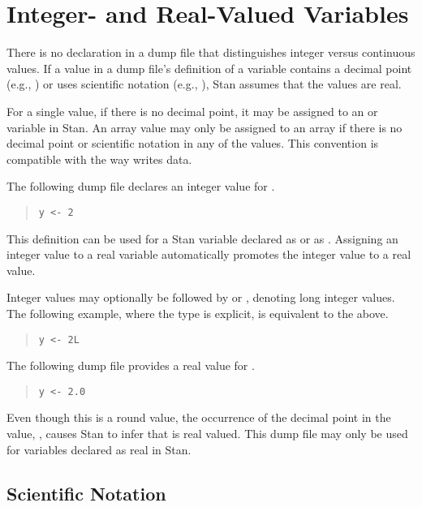 \section{Integer- and Real-Valued Variables}

There is no declaration in a dump file that distinguishes integer
versus continuous values.  If a value in a dump file's definition of a
variable contains a decimal point (e.g., ) or uses
scientific notation (e.g., ), Stan assumes that the
values are real.

For a single value, if there is no decimal point, it may be assigned
to an  or  variable in Stan.  An array value may
only be assigned to an  array if there is no decimal point
or scientific notation in any of the values.  This convention is
compatible with the way \R writes data.

The following dump file declares an integer value for .
%
\begin{quote}
\begin{Verbatim} 
y <- 2
\end{Verbatim}
\end{quote}
% 
This definition can be used for a Stan variable  declared as
 or as .  Assigning an integer value to a real
variable automatically promotes the integer value to a real value.

Integer values may optionally be followed by  or ,
denoting long integer values.  The following example, where the type is
explicit, is equivalent to the above.
%
\begin{quote}
\begin{Verbatim} 
y <- 2L
\end{Verbatim}
\end{quote}

The following dump file provides a real value for .
%
\begin{quote}
\begin{Verbatim}
y <- 2.0
\end{Verbatim}
\end{quote}
%
Even though this is a round value, the occurrence of the decimal
point in the value, , causes Stan to infer that  is
real valued.  This dump file may only be used for variables 
declared as real in Stan.

\subsection{Scientific Notation}

